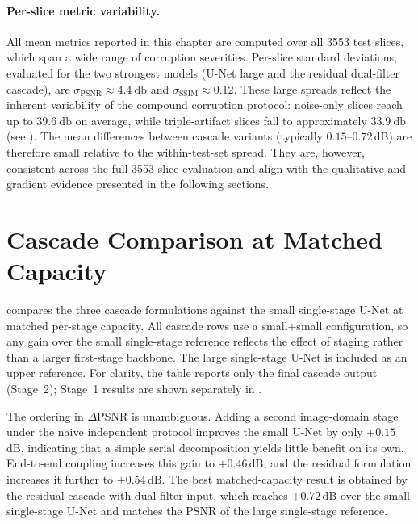 \paragraph{Per-slice metric variability.}
All mean metrics reported in this chapter are computed over all \num{3553} test slices, which span a wide range of corruption severities. Per-slice standard deviations, evaluated for the two strongest models (U-Net large and the residual dual-filter cascade), are $\sigma_{\mathrm{PSNR}} \approx \SI{4.4}{\decibel}$ and $\sigma_{\mathrm{SSIM}} \approx 0.12$. These large spreads reflect the inherent variability of the compound corruption protocol: noise-only slices reach up to $\SI{39.6}{\decibel}$ on average, while triple-artifact slices fall to approximately $\SI{33.9}{\decibel}$ (see ). The mean differences between cascade variants (typically $0.15$--$0.72$\,dB) are therefore small relative to the within-test-set spread. They are, however, consistent across the full \num{3553}-slice evaluation and align with the qualitative and gradient evidence presented in the following sections.
\section{Cascade Comparison at Matched Capacity}
\label{sec:exp_cascade}
\label{sec:exp_quantitative}

 compares the three cascade formulations against the small single-stage U-Net at matched per-stage capacity. All cascade rows use a small$+$small configuration, so any gain over the small single-stage reference reflects the effect of staging rather than a larger first-stage backbone. The large single-stage U-Net is included as an upper reference. For clarity, the table reports only the final cascade output (Stage~2); Stage~1 results are shown separately in .

The ordering in $\Delta$PSNR is unambiguous. Adding a second image-domain stage under the naive independent protocol improves the small U-Net by only $+0.15$\,dB, indicating that a simple serial decomposition yields little benefit on its own. End-to-end coupling increases this gain to $+0.46$\,dB, and the residual formulation increases it further to $+0.54$\,dB. The best matched-capacity result is obtained by the residual cascade with dual-filter input, which reaches $+0.72$\,dB over the small single-stage U-Net and matches the PSNR of the large single-stage reference.

